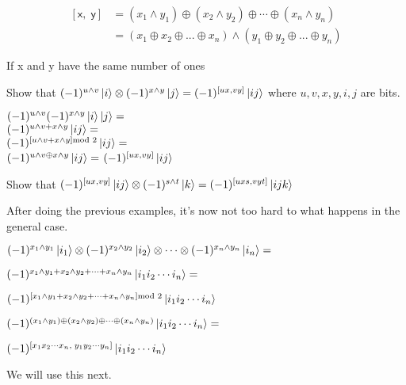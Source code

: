 \[ 
\begin{array}{ll}
[\textsf{x}, \; \textsf{y}] &= (x_1 \wedge y_1) \oplus (x_2 \wedge y_2) \oplus \dotsm \oplus (x_n \wedge y_n)  \\
         &= (x_1 \oplus x_2 \oplus ... \oplus x_n) \wedge (y_1 \oplus y_2 \oplus ... \oplus y_n)
\end{array}
\] 

If \textsf{x} and \textsf{y} have the same number of ones 



\frmrule

\begin{example}
Show that $(-1)^{u \wedge v}\left|i\right\rangle \otimes (-1)^{x \wedge y}\left|j\right\rangle = (-1)^{[ux,vy]}\left|ij\right\rangle$ 
where $u,v,x,y,i,j$ are bits.
\end{example}

\frmrule

$(-1)^{u \wedge v} (-1)^{x \wedge y} \left|i\right\rangle \left|j\right\rangle = $\\
$(-1)^{u \wedge v + x \wedge y} \left|ij\right\rangle = $\\
$(-1)^{[u \wedge v + x \wedge y]\text{mod } 2} \left|ij\right\rangle = $\\
$(-1)^{u \wedge v \oplus x \wedge y} \left|ij\right\rangle = $
$(-1)^{[ux, vy]} \left|ij\right\rangle $


\frmrule

\begin{example}
Show that $(-1)^{[ux,vy]}\left|ij\right\rangle \otimes (-1)^{s \wedge t}\left|k\right\rangle = (-1)^{[uxs,vyt]}\left|ijk\right\rangle$ 
\end{example}

\frmrule

After doing the previous examples, it's now not too hard to what happens 
in the general case. 

$(-1)^{x_1 \wedge y_1}\left|i_1\right\rangle \otimes
(-1)^{x_2 \wedge y_2}\left|i_2\right\rangle \otimes
\dotsm \otimes
(-1)^{x_n \wedge y_n}\left|i_n\right\rangle = $ 

$(-1)^{x_1 \wedge y_1 + x_2 \wedge y_2 + \dotsm + x_n \wedge y_n}\left|i_1 i_2 \dotsm i_n\right\rangle = $

$(-1)^{[x_1 \wedge y_1 + x_2 \wedge y_2 + \dotsm + x_n \wedge y_n] \text{mod } 2}\left|i_1 i_2 \dotsm i_n\right\rangle$

$(-1)^{(x_1 \wedge y_1) \oplus (x_2 \wedge y_2) \oplus \dotsm \oplus (x_n \wedge y_n)}
\left|i_1 i_2 \dotsm i_n\right\rangle =$

$(-1)^{[x_1 x_2 \dotsm x_n, \; y_1 y_2 \dotsm y_n]}
\left|i_1 i_2 \dotsm i_n\right\rangle$

We will use this next.

